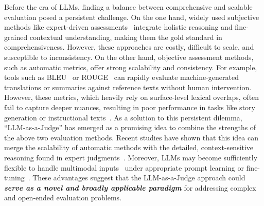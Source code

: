 \documentclass[acmsmall,screen]{acmart}
\newcommand{\xz}[1]{\textcolor{orange}{#1}}
\begin{document}

Before the era of LLMs, finding a balance between comprehensive and scalable evaluation posed a persistent challenge. On the one hand, widely used subjective methods like expert-driven assessments~\cite {shi2024judging,human_like_summarization} integrate holistic reasoning and fine-grained contextual understanding, making them the gold standard in comprehensiveness. However, these approaches are costly, difficult to scale, and susceptible to inconsistency.
On the other hand, objective assessment methods, such as automatic metrics, offer strong scalability and consistency. For example, tools such as BLEU~\cite{papineni2002bleu} or ROUGE~\cite{lin2004rouge} can rapidly evaluate machine-generated translations or summaries against reference texts without human intervention. However, these metrics, which heavily rely on surface-level lexical overlaps, often fail to capture deeper nuances, resulting in poor performance in tasks like story generation or instructional texts~\cite{schluter-2017-limits}.
As a solution to this persistent dilemma, ``LLM-as-a-Judge'' has emerged as a promising idea to combine the strengths of the above two evaluation methods. Recent studies have shown that this idea can merge the scalability of automatic methods with the detailed, context-sensitive reasoning found in expert judgments~\cite{nips_llm_as_a_judge,wang2023pandalm,zhu2023judgelm,auto-j,data-juicer}.
Moreover, LLMs may become sufficiently flexible to handle multimodal inputs~\cite{mllm-as-a-judge} under appropriate prompt learning or fine-tuning~\cite{khattak2023maple}.
These advantages suggest that the LLM-as-a-Judge approach could \textbf{\textit{serve as a novel and broadly applicable paradigm}} for addressing complex and open-ended evaluation problems.
\end{document}
